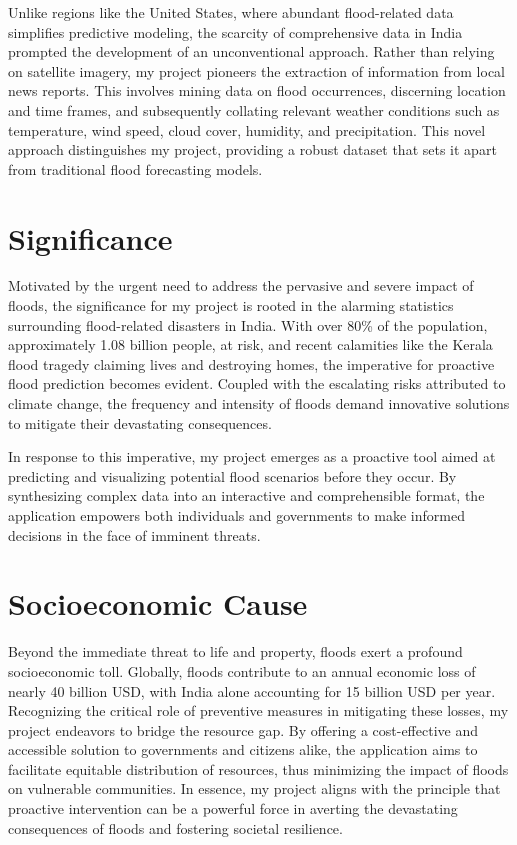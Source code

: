 \documentclass[a4paper,12pt]{report}
\begin{document}
Unlike regions like the United States, where abundant flood-related data simplifies predictive modeling, the scarcity of comprehensive data in India prompted the development of an unconventional approach. Rather than relying on satellite imagery, my project pioneers the extraction of information from local news reports. This involves mining data on flood occurrences, discerning location and time frames, and subsequently collating relevant weather conditions such as temperature, wind speed, cloud cover, humidity, and precipitation. This novel approach distinguishes my project, providing a robust dataset that sets it apart from traditional flood forecasting models.

\section{Significance}

Motivated by the urgent need to address the pervasive and severe impact of floods, the significance for my project is rooted in the alarming statistics surrounding flood-related disasters in India. With over 80\% of the population, approximately 1.08 billion people, at risk, and recent calamities like the Kerala flood tragedy claiming lives and destroying homes, the imperative for proactive flood prediction becomes evident. Coupled with the escalating risks attributed to climate change, the frequency and intensity of floods demand innovative solutions to mitigate their devastating consequences.

In response to this imperative, my project emerges as a proactive tool aimed at predicting and visualizing potential flood scenarios before they occur. By synthesizing complex data into an interactive and comprehensible format, the application empowers both individuals and governments to make informed decisions in the face of imminent threats.

\section{Socioeconomic Cause}

Beyond the immediate threat to life and property, floods exert a profound socioeconomic toll. Globally, floods contribute to an annual economic loss of nearly 40 billion USD, with India alone accounting for 15 billion USD per year. Recognizing the critical role of preventive measures in mitigating these losses, my project endeavors to bridge the resource gap. By offering a cost-effective and accessible solution to governments and citizens alike, the application aims to facilitate equitable distribution of resources, thus minimizing the impact of floods on vulnerable communities. In essence, my project aligns with the principle that proactive intervention can be a powerful force in averting the devastating consequences of floods and fostering societal resilience.
\end{document}
